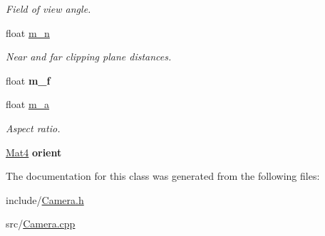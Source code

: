 \begin{DoxyCompactItemize}
\begin{DoxyCompactList}\small\item\em Field of view angle. \item\end{DoxyCompactList}\item 
\hypertarget{classCamera_aab82c58123975d70ee4dde04ba7d0e0a}{
float \hyperlink{classCamera_aab82c58123975d70ee4dde04ba7d0e0a}{m\_\-n}}
\label{classCamera_aab82c58123975d70ee4dde04ba7d0e0a}

\begin{DoxyCompactList}\small\item\em Near and far clipping plane distances. \item\end{DoxyCompactList}\item 
\hypertarget{classCamera_ad8d7490901ca245afb196efc110b3d94}{
float {\bfseries m\_\-f}}
\label{classCamera_ad8d7490901ca245afb196efc110b3d94}

\item 
\hypertarget{classCamera_a8974b7f77fc07dd0f5eed176ed953393}{
float \hyperlink{classCamera_a8974b7f77fc07dd0f5eed176ed953393}{m\_\-a}}
\label{classCamera_a8974b7f77fc07dd0f5eed176ed953393}

\begin{DoxyCompactList}\small\item\em Aspect ratio. \item\end{DoxyCompactList}\item 
\hypertarget{classCamera_a371efa1d693cab0c5502048c158fb9e9}{
\hyperlink{classMat4}{Mat4} {\bfseries orient}}
\label{classCamera_a371efa1d693cab0c5502048c158fb9e9}

\end{DoxyCompactItemize}


The documentation for this class was generated from the following files:\begin{DoxyCompactItemize}
\item 
include/\hyperlink{Camera_8h}{Camera.h}\item 
src/\hyperlink{Camera_8cpp}{Camera.cpp}\end{DoxyCompactItemize}
